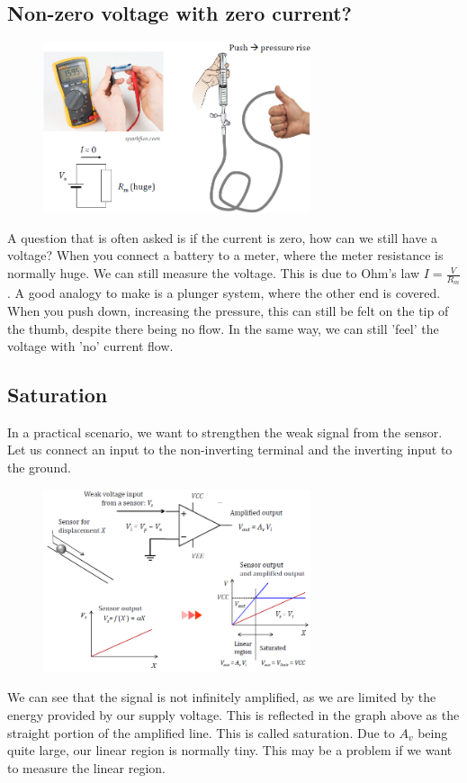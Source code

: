 \documentclass[class=report, crop=false, 12pt,a4paper]{standalone}
\begin{document}
\subsection{Non-zero voltage with zero current?}
\begin{figure}[H]
  \centering
  \includegraphics[width = 0.7\textwidth]{../img/diagram44.png}
\end{figure}
A question that is often asked is if the current is zero, how can we still have a voltage? When you connect a battery to a meter, where the meter resistance is normally huge. We can still measure the voltage. This is due to Ohm's law $I = \frac{V}{R_m}$. A good analogy to make is a plunger system, where the other end is covered. When you push down, increasing the pressure, this can still be felt on the tip of the thumb, despite there being no flow. In the same way, we can still 'feel' the voltage with 'no' current flow.
\subsection{Saturation}
In a practical scenario, we want to strengthen the weak signal from the sensor. Let us connect an input to the non-inverting terminal and the inverting input to the ground.
\begin{figure}[H]
  \centering
  \includegraphics[width = 0.7\textwidth]{../img/diagram45.png}
\end{figure}
We can see that the signal is not infinitely amplified, as we are limited by the energy provided by our supply voltage. This is reflected in the graph above as the straight portion of the amplified line. This is called saturation. Due to $A_v$ being quite large, our linear region is normally tiny. This may be a problem if we want to measure the linear region.
\end{document}
